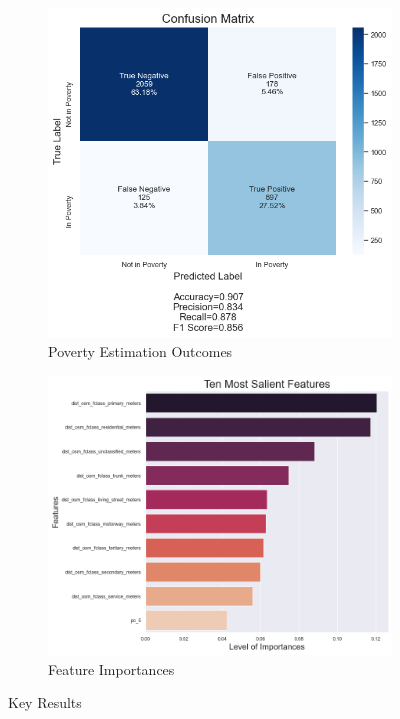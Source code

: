 \documentclass[8pt, oneside]{article}
\begin{document}
\begin{figure}[ht]
\begin{subfigure}{.45\textwidth}
  \centering
  \includegraphics[width=1\textwidth]{Figures/confusion_matrix.png}   
  \caption{Poverty Estimation Outcomes}
  \label{fig:sub-first}
\end{subfigure}
\begin{subfigure}{.55\textwidth}
  \centering
  \includegraphics[width=1\textwidth]{Figures/feature_importances.png}   
  \caption{Feature Importances}
  \label{fig:sub-second}
\end{subfigure}
 \caption{Key Results}     
\label{fig:pscore_change_hist}
\end{figure}
\end{document}
